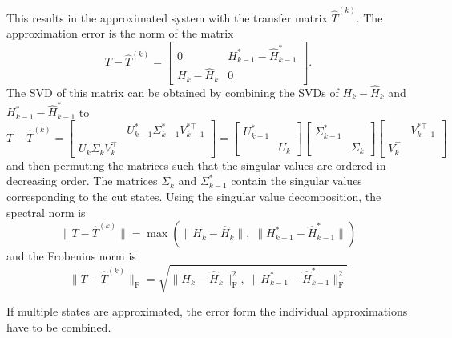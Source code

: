 \documentclass[numbers=noenddot,doctype=mastersthesis,BCOR=15mm,biblatex]{ldvbook}%
\newcommand{\R}{\mathcal{R}} %
\newcommand{\Ob}{\mathcal{O}} %
\begin{document}
This results in the approximated system with the transfer matrix $\hat{T}^{(k)}$.
The approximation error is the norm of the matrix
\begin{equation}
	T-\hat{T}^{(k)} = 
	\begin{bmatrix}
	0&H^*_{k-1}-\hat{H}^*_{k-1}\\
	H_k-\hat{H}_k&0
	\end{bmatrix}.
\end{equation}
The SVD of this matrix can be obtained by combining the SVDs of $H_k-\hat{H}_k$ and $H^*_{k-1}-\hat{H}^*_{k-1}$ to
\begin{equation*}
T-\hat{T}^{(k)}=
	\begin{bmatrix}
	 & U_{k-1}^*\Sigma_{k-1}^* V_{k-1}^{*\top}\\
	 U_k\Sigma_k V_k^\top
	\end{bmatrix}
	=
	\begin{bmatrix}
	U_{k-1}^*\\
	&U_k
	\end{bmatrix}
	\begin{bmatrix}
\Sigma_{k-1}^*\\
&\Sigma_{k}
\end{bmatrix}
	\begin{bmatrix}
&V_{k-1}^{*\top}\\
V_{k}^\top
\end{bmatrix}
\end{equation*}
and then permuting the matrices such that the singular values are ordered in decreasing order.
The matrices $\Sigma_k$ and $\Sigma_{k-1}^*$ contain the singular values corresponding to the cut states.
Using the singular value decomposition, the spectral norm is
\begin{equation}\label{eq:bound_single}
	\|T-\hat{T}^{(k)}\| = \max\left(\|H_k-\hat{H}_k\|,\;\|H^*_{k-1}-\hat{H}^*_{k-1}\|\right)
\end{equation}
and the Frobenius norm is
\begin{equation}
	\|T-\hat{T}^{(k)}\|_\text{F} = \sqrt{\|H_k-\hat{H}_k\|_\text{F}^2,\;\|H^*_{k-1}-\hat{H}^*_{k-1}\|_\text{F}^2}
\end{equation}


If multiple states are approximated, the error form the individual approximations have to be combined.
\end{document}

